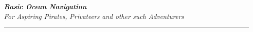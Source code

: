 \documentclass[landscape,DIV=18,a3paper,10pt]{article}
\begin{document}

%

\begin{center}

\medskip

\huge \textit{\color{myRed}\bfseries Basic Ocean Navigation} \\\textit{\large \color{myGreen}For Aspiring Pirates, Privateers and other such Adventurers}

\rule{1.1\linewidth}{1pt}\\


\medskip
\end{center}

%
%
\end{document}
